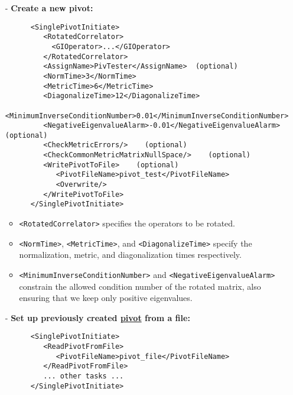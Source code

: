 \documentclass[12pt]{article}
\newcommand{\vb}{\texttt}
\begin{document}
\begin{itemize}
\item[-] \textbf{Create a new pivot:}
\begin{verbatim}
      <SinglePivotInitiate>                                                      
         <RotatedCorrelator>                                                     
           <GIOperator>...</GIOperator>                                          
         </RotatedCorrelator>                                                    
         <AssignName>PivTester</AssignName>  (optional)                          
         <NormTime>3</NormTime>                                                  
         <MetricTime>6</MetricTime>                                              
         <DiagonalizeTime>12</DiagonalizeTime>                                   
         <MinimumInverseConditionNumber>0.01</MinimumInverseConditionNumber>     
         <NegativeEigenvalueAlarm>-0.01</NegativeEigenvalueAlarm>  (optional)    
         <CheckMetricErrors/>    (optional)                                      
         <CheckCommonMetricMatrixNullSpace/>    (optional)                       
         <WritePivotToFile>    (optional)                                        
            <PivotFileName>pivot_test</PivotFileName>                            
            <Overwrite/>                                                         
         </WritePivotToFile>                                                     
      </SinglePivotInitiate>                                                     
\end{verbatim}
\begin{itemize}
\item \vb{<RotatedCorrelator>} specifies the operators to be rotated.
\item \vb{<NormTime>}, \vb{<MetricTime>}, and \vb{<DiagonalizeTime>} specify the normalization, metric, and diagonalization times respectively.
\item \vb{<MinimumInverseConditionNumber>} and \vb{<NegativeEigenvalueAlarm>} constrain the allowed condition number of the rotated matrix, also ensuring that we keep only positive eigenvalues.
\end{itemize}

\item[-] \textbf{Set up previously created \underline{pivot} from a file:}
\begin{verbatim}
      <SinglePivotInitiate>                                                      
         <ReadPivotFromFile>                                                     
            <PivotFileName>pivot_file</PivotFileName>                            
         </ReadPivotFromFile>                                                    
         ... other tasks ...                                                     
      </SinglePivotInitiate>                                                     
\end{verbatim}


\end{itemize}
\end{document}

